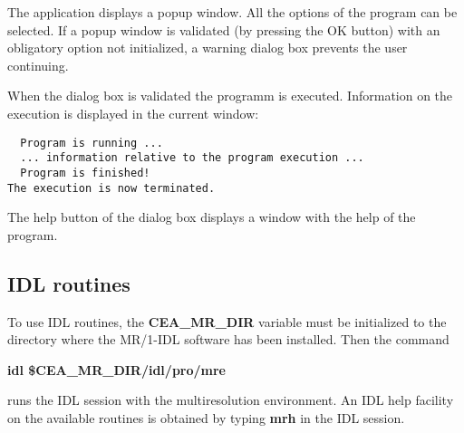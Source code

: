 The application displays a popup window. All the options of the 
program can be
selected. If a popup window is validated (by pressing the  
OK button) with an obligatory 
option not initialized, a warning dialog box prevents the user continuing.

When the dialog box is validated the programm is executed. 
Information on the execution is displayed in the current window: 
\begin{verbatim}
  Program is running ...
  ... information relative to the program execution ...
  Program is finished!
The execution is now terminated.
\end{verbatim}

The help button of the dialog box displays a window with the help of the 
program.


\subsection{IDL routines}

To use IDL routines, the {\bf CEA\_MR\_DIR} variable 
must be initialized to the directory
where the MR/1-IDL software has been installed. Then 
the command
\begin{center}
{\bf idl \$CEA\_MR\_DIR/idl/pro/mre} 
\end{center}
runs the IDL session with the 
multiresolution environment. An IDL help facility on the available routines
is obtained by typing {\bf mrh} in the IDL session. 





